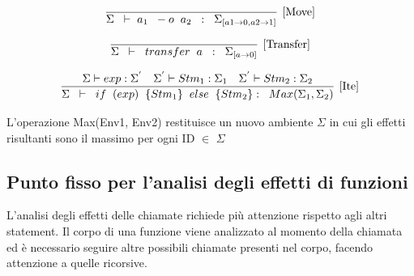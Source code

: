 \documentclass[12pt,twoside,openright,a4paper]{report}
\begin{document}
    \begin{align*}
    \infer[\mathrm{[Move]}]
    {\Sigma \hspace{0.2cm} \vdash  \hspace{0.1cm}a_{1}\hspace{0.2cm} -o\hspace{0.2cm} a_{2} \hspace{0.2cm}: \hspace{0.2cm}\Sigma_{[a1 \to 0, a2 \to 1]} } 
    {}
    \end{align*}
    
    \begin{align*}
    \infer[\mathrm{[Transfer]}]
    {\Sigma \hspace{0.2cm} \vdash  \hspace{0.2cm}transfer\hspace{0.1cm} \hspace{0.1cm} a \hspace{0.2cm}: \hspace{0.2cm}\Sigma_{[a \to 0]} } 
    {}
    \end{align*}
    
    \begin{align*}
    \infer[\mathrm{[Ite]}]
    {\Sigma \hspace{0.2cm} \vdash  \hspace{0.2cm}if\hspace{0.2cm} (exp)\hspace{0.2cm} \{Stm_{1}\}\hspace{0.2cm} else \hspace{0.2cm}\{Stm_{2}\} : \hspace{0.2cm}Max(\Sigma_{1},\Sigma_{2}) } 
    {  \Sigma \vdash exp : \Sigma^{'} &  \Sigma^{'} \vdash Stm_{1} :  \Sigma_{1} & \Sigma^{'} \vdash Stm_{2} : \Sigma_{2} }
    \end{align*}
    
    L'operazione Max(Env1, Env2) restituisce un nuovo ambiente $\Sigma$ in cui gli effetti risultanti sono il massimo per ogni ID $\in$ $\Sigma$ 
    
    
\subsection{Punto fisso per l'analisi degli effetti di funzioni}
L'analisi degli effetti delle chiamate richiede più attenzione rispetto agli altri statement. Il corpo di una funzione viene analizzato al momento della chiamata ed è necessario seguire altre possibili chiamate presenti nel corpo, facendo attenzione a quelle ricorsive.
\end{document}
